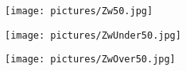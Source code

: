 \begin{figure}[h]
    \centering
    \begin{subfigure}{.4\textwidth} %
        \centering
        \texttt{[image: pictures/Zw50.jpg]} \\
        \caption{}
    \end{subfigure}

    \begin{subfigure}{.4\textwidth} %
        \centering
        \texttt{[image: pictures/ZwUnder50.jpg]} \\
        \caption{}
    \end{subfigure}
    \hfill%
    \begin{subfigure}{.4\textwidth} %
        \centering
        \texttt{[image: pictures/ZwOver50.jpg]} \\
        \caption{}
    \end{subfigure}
\end{figure}